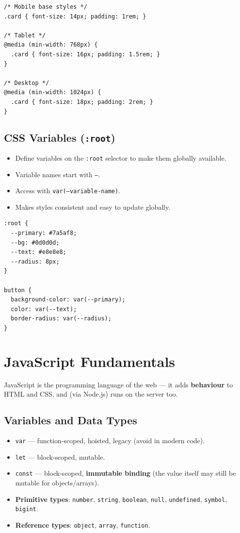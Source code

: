 \documentclass[hidelinks]{article}
\begin{document}
\begin{lstlisting}[language={}, caption={Responsive breakpoints (mobile-first)}]
/* Mobile base styles */
.card { font-size: 14px; padding: 1rem; }

/* Tablet */
@media (min-width: 768px) {
  .card { font-size: 16px; padding: 1.5rem; }
}

/* Desktop */
@media (min-width: 1024px) {
  .card { font-size: 18px; padding: 2rem; }
}
\end{lstlisting}

\subsection{CSS Variables (\texttt{:root})}
\begin{itemize}
  \item Define variables on the \texttt{:root} selector to make them globally available.
  \item Variable names start with \texttt{--}.
  \item Access with \texttt{var(--variable-name)}.
  \item Makes styles consistent and easy to update globally.
\end{itemize}

\begin{lstlisting}[language={}, caption={CSS variables example}]
:root {
  --primary: #7a5af8;
  --bg: #0d0d0d;
  --text: #e8e8e8;
  --radius: 8px;
}

button {
  background-color: var(--primary);
  color: var(--text);
  border-radius: var(--radius);
}
\end{lstlisting}

\newpage
\section{JavaScript Fundamentals}

JavaScript is the programming language of the web --- it adds \textbf{behaviour} to HTML and CSS, and (via Node.js) runs on the server too.

\subsection{Variables and Data Types}
\begin{itemize}
  \item \texttt{var} --- function-scoped, hoisted, legacy (avoid in modern code).
  \item \texttt{let} --- block-scoped, mutable.
  \item \texttt{const} --- block-scoped, \textbf{immutable binding} (the value itself may still be mutable for objects/arrays).
  \item \textbf{Primitive types}: \texttt{number}, \texttt{string}, \texttt{boolean}, \texttt{null}, \texttt{undefined}, \texttt{symbol}, \texttt{bigint}.
  \item \textbf{Reference types}: \texttt{object}, \texttt{array}, \texttt{function}.
\end{itemize}
\end{document}
